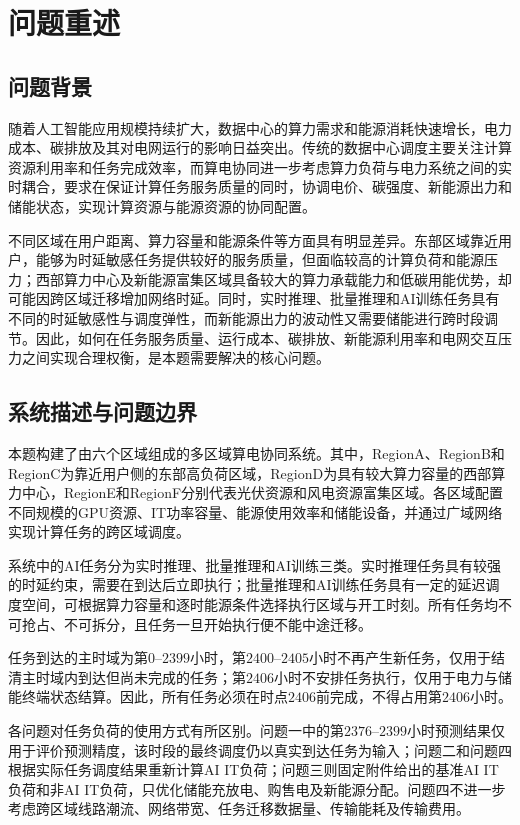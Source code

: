 \documentclass[UTF8,a4paper,zihao=-4]{ctexart}
\begin{document}
\section{问题重述}

\subsection{问题背景}

随着人工智能应用规模持续扩大，数据中心的算力需求和能源消耗快速增长，电力成本、碳排放及其对电网运行的影响日益突出\cite{邓维2013新能源,宋杰2018混合供电}。传统的数据中心调度主要关注计算资源利用率和任务完成效率，而算电协同进一步考虑算力负荷与电力系统之间的实时耦合，要求在保证计算任务服务质量的同时，协调电价、碳强度、新能源出力和储能状态，实现计算资源与能源资源的协同配置\cite{黄焱2016能耗费用}。

不同区域在用户距离、算力容量和能源条件等方面具有明显差异。东部区域靠近用户，能够为时延敏感任务提供较好的服务质量，但面临较高的计算负荷和能源压力；西部算力中心及新能源富集区域具备较大的算力承载能力和低碳用能优势，却可能因跨区域迁移增加网络时延。同时，实时推理、批量推理和AI训练任务具有不同的时延敏感性与调度弹性，而新能源出力的波动性又需要储能进行跨时段调节。因此，如何在任务服务质量、运行成本、碳排放、新能源利用率和电网交互压力之间实现合理权衡，是本题需要解决的核心问题。

\subsection{系统描述与问题边界}

本题构建了由六个区域组成的多区域算电协同系统。其中，RegionA、RegionB和RegionC为靠近用户侧的东部高负荷区域，RegionD为具有较大算力容量的西部算力中心，RegionE和RegionF分别代表光伏资源和风电资源富集区域。各区域配置不同规模的GPU资源、IT功率容量、能源使用效率和储能设备，并通过广域网络实现计算任务的跨区域调度。

系统中的AI任务分为实时推理、批量推理和AI训练三类。实时推理任务具有较强的时延约束，需要在到达后立即执行；批量推理和AI训练任务具有一定的延迟调度空间，可根据算力容量和逐时能源条件选择执行区域与开工时刻。所有任务均不可抢占、不可拆分，且任务一旦开始执行便不能中途迁移。

任务到达的主时域为第$0$--$2399$小时，第$2400$--$2405$小时不再产生新任务，仅用于结清主时域内到达但尚未完成的任务；第$2406$小时不安排任务执行，仅用于电力与储能终端状态结算。因此，所有任务必须在时点$2406$前完成，不得占用第$2406$小时。

各问题对任务负荷的使用方式有所区别。问题一中的第$2376$--$2399$小时预测结果仅用于评价预测精度，该时段的最终调度仍以真实到达任务为输入；问题二和问题四根据实际任务调度结果重新计算AI IT负荷；问题三则固定附件给出的基准AI IT负荷和非AI IT负荷，只优化储能充放电、购售电及新能源分配。问题四不进一步考虑跨区域线路潮流、网络带宽、任务迁移数据量、传输能耗及传输费用。
\end{document}
